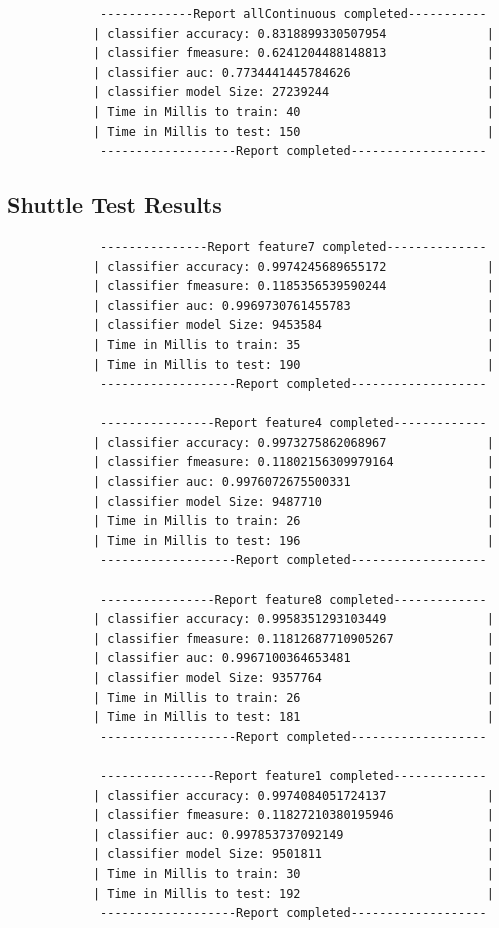 \documentclass[a4paper,11pt]{scrreprt}
\begin{document}
\begin{verbatim}
			 -------------Report allContinuous completed-----------
			| classifier accuracy: 0.8318899330507954              |
			| classifier fmeasure: 0.6241204488148813              |
			| classifier auc: 0.7734441445784626                   |
			| classifier model Size: 27239244                      |
			| Time in Millis to train: 40                          |
			| Time in Millis to test: 150                          |
			 -------------------Report completed-------------------
\end{verbatim}

\subsection{Shuttle Test Results}
\begin{verbatim}
			 ---------------Report feature7 completed--------------
			| classifier accuracy: 0.9974245689655172              |
			| classifier fmeasure: 0.1185356539590244              |
			| classifier auc: 0.9969730761455783                   |
			| classifier model Size: 9453584                       |
			| Time in Millis to train: 35                          |
			| Time in Millis to test: 190                          |
			 -------------------Report completed-------------------

			 ----------------Report feature4 completed-------------
			| classifier accuracy: 0.9973275862068967              |
			| classifier fmeasure: 0.11802156309979164             |
			| classifier auc: 0.9976072675500331                   |
			| classifier model Size: 9487710                       |
			| Time in Millis to train: 26                          |
			| Time in Millis to test: 196                          |
			 -------------------Report completed-------------------
			
			 ----------------Report feature8 completed-------------
			| classifier accuracy: 0.9958351293103449              |
			| classifier fmeasure: 0.11812687710905267             |
			| classifier auc: 0.9967100364653481                   |
			| classifier model Size: 9357764                       |
			| Time in Millis to train: 26                          |
			| Time in Millis to test: 181                          |
			 -------------------Report completed-------------------

			 ----------------Report feature1 completed-------------
			| classifier accuracy: 0.9974084051724137              |
			| classifier fmeasure: 0.11827210380195946             |
			| classifier auc: 0.997853737092149                    |
			| classifier model Size: 9501811                       |
			| Time in Millis to train: 30                          |
			| Time in Millis to test: 192                          |
			 -------------------Report completed-------------------
			 

\end{verbatim}
\end{document}

